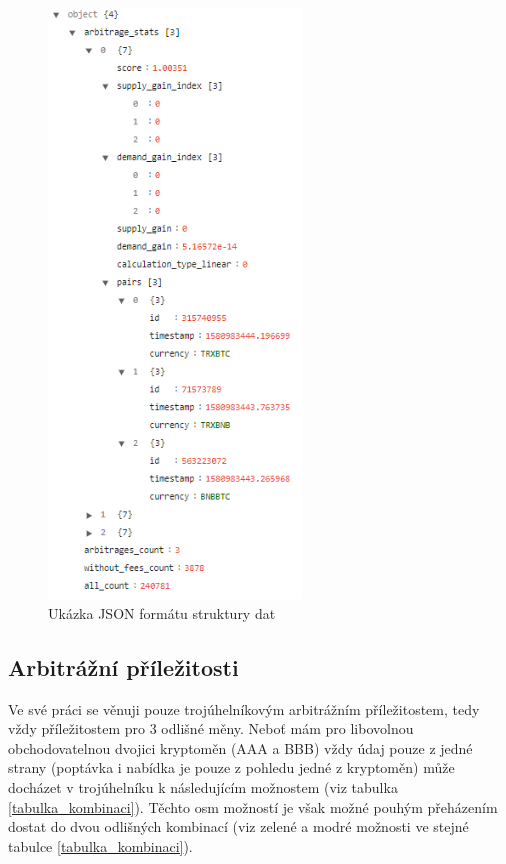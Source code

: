 \documentclass[thesis=B,czech]{FITthesis}[2019/03/21]
\begin{document}
\begin{figure}\centering
	\includegraphics[width=0.6\textwidth]{images/json_data.PNG}
	\caption{Ukázka JSON formátu struktury dat}\label{json_data}
\end{figure}
\subsection{Arbitrážní příležitosti}
Ve své práci se věnuji pouze trojúhelníkovým arbitrážním příležitostem, tedy vždy příležitostem pro 3 odlišné měny. Neboť mám pro libovolnou obchodovatelnou dvojici kryptoměn (AAA a BBB) vždy údaj pouze z jedné strany (poptávka i nabídka je pouze z pohledu jedné z kryptoměn) může docházet v trojúhelníku k následujícím možnostem (viz tabulka \ref{tabulka_kombinaci}). Těchto osm možností je však možné pouhým přeházením dostat do dvou odlišných kombinací (viz zelené a modré možnosti ve stejné tabulce \ref{tabulka_kombinaci}).
\end{document}
